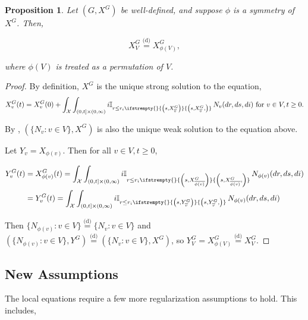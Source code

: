 \documentclass[12pt]{article}
\newcommand{\mb}{\mathbb}
\newcommand{\mc}{\mathcal}
\newcommand{\ov}{\overline}
\newcommand{\te}{\text}
\newcommand{\ind}{\hspace{24pt}}
\newcommand{\deq}{\overset{\text{(d)}}{=}}			%
\newcommand{\sta}{\mc{X}}							%
\newcommand{\cl}[1]{\ov{#1}}						%
\newcommand{\Xf}{X}									%
\newcommand{\poiss}{N}								%
\newcommand{\rate}{r}								%
\newcommand{\poissv}[1]{_{#1}}						%
\newcommand{\vind}[1]{_{#1}}						%
\newcommand{\tme}[1]{(#1)}							%
\newcommand{\gind}[1]{^{#1}}						%
\newcommand{\stpara}[1]{_{#1}}						%
\newcommand{\tmepro}[3]{
\ifstrempty{#3}{
	\left(#1,#2\right)}{
	\left(#1,#2,#3\right)}}							%
\newcommand{\Xg}{Y}									%
\newtheorem{prop}[thms]{Proposition}
\begin{document}
\begin{prop}
Let \((G,\Xf\gind{G})\) be well-defined, and suppose \(\phi\) is a symmetry of \(\Xf\gind{G}\). Then,

\[\Xf\gind{G}\vind{V} \deq \Xf\gind{G}\vind{\phi(V)},\]

where \(\phi(V)\) is treated as a permutation of \(V\).
\label{a::simprop}
\end{prop}
\begin{proof}
By definition, \(\Xf\gind{G}\) is the unique strong solution to the equation,
\[\Xf\gind{G}\vind{v}\tme{t} = \Xf\gind{G}\vind{v}\tme{0} + \int_\sta\int_{(0,t]\times(0,\infty)} i\mb{I}_{r \leq \rate\stpara{i}\tmepro{s}{\Xf\gind{G}\vind{\cl{v}}}{}}\,\poiss\poissv{v}(dr,ds,di) \te{ for } v \in V, t \geq 0.\]

By \cite[Proposition 2.10]{Kur07}, \((\{\poiss\poissv{v}:v\in V\},\Xf\gind{G})\) is also the unique weak solution to the equation above.

\ind Let \(\Xg\vind{v} = \Xf\vind{\phi(v)}\). Then for all \(v\in V,t\geq 0\),

\begin{align*}
\Xg\gind{G}\vind{v}\tme{t} &= \Xf\gind{G}\vind{\phi(v)}\tme{t} = \int_\sta\int_{(0,t]\times(0,\infty)} i\mb{I}_{r \leq \rate\stpara{i}\tmepro{s}{\Xf\gind{G}\vind{\cl{\phi(v)}}}{}}\,\poiss\poissv{\phi(v)}(dr,ds,di)\\
&= \Xg\gind{G}\vind{v}\tme{t} = \int_\sta\int_{(0,t]\times(0,\infty)} i\mb{I}_{r \leq \rate\stpara{i}\tmepro{s}{\Xg\gind{G}\vind{\cl{v}}}{}}\,\poiss\poissv{\phi(v)}(dr,ds,di)\\
\end{align*}

Then \(\{\poiss\poissv{\phi(v)}:v \in V\} \deq \{\poiss\poissv{v}:v\in V\}\) and \((\{\poiss\poissv{\phi(v)}:v \in V\},\Xg\gind{G}) \deq (\{\poiss\poissv{v}:v \in V\},\Xf\gind{G})\), so \(\Xg\gind{G}\vind{V} = \Xf\gind{G}\vind{\phi(V)} \deq \Xf\gind{G}\vind{V}\).
\end{proof}



\subsection{New Assumptions}
\label{a::not}

The local equations require a few more regularization assumptions to hold. This includes,
\end{document}

